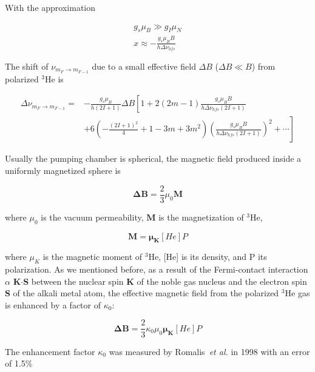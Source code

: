 With the approximation

\begin{subequations}
	\begin{gather}
	g_{s}\mu_{B} \gg g_{I}\mu_{N}\\
	x \approx -\frac{g_{s}\mu_{B}B}{h\Delta \nu_{hfs}}
	\end{gather}
\end{subequations}

The shift of $\nu_{m_{F}\rightarrow m_{F-1}}$ due to a small effective field $\Delta B$ ($\Delta B \ll B$) from polarized $^{3}$He is

\begin{equation}
\begin{split}
\Delta \nu_{m_{F}\rightarrow m_{F-1}} = &-\frac{g_{s}\mu_{B}}{h(2I+1)} \Delta B \left[1+ 2(2m-1)\frac{g_{s}\mu_{B}B}{h \Delta\nu_{hfs}(2I+1)}\right.\\ 
&\left.+6\left(-\frac{(2I+1)^{2}}{4}+1-3m+3m^{2}\right)\left(\frac{g_{s}\mu_{B}B}{h \Delta\nu_{hfs}(2I+1)}\right)^{2}+\cdots\right]
\end{split}
\end{equation}

Usually the pumping chamber is spherical, the magnetic field produced inside a uniformly magnetized sphere is

\begin{equation}
\boldsymbol{\Delta B}=\frac{2}{3}\mu_{0}\boldsymbol{M}
\end{equation}

where $\mu_{0}$ is the vacuum permeability, $\boldsymbol{M}$ is the magnetization of $^{3}$He, 

\begin{equation}
\boldsymbol{M}=\boldsymbol{\mu_{K}}[He]P
\end{equation}

where $\mu_{K}$ is the magnetic moment of $^{3}$He, [He] is its density, and P its polarization. As we mentioned before, as a result of the Fermi-contact interaction $\alpha$ {\bf K$\cdot$S} between the nuclear spin {\bf K} of the noble gas nucleus and the electron spin {\bf S} of the alkali metal atom, the effective magnetic field from the polarized $^{3}$He gas is enhanced by a factor of $\kappa_{0}$:

\begin{equation}
\boldsymbol{\Delta B}=\frac{2}{3} \kappa_{0}\mu_{0}\boldsymbol{\mu_{K}}[He]P
\end{equation}

The enhancement factor $\kappa_{0}$ was measured by Romalis~\emph{et al.} in 1998 with an error of 1.5\%~\cite{PhysRevA.58.3004}

